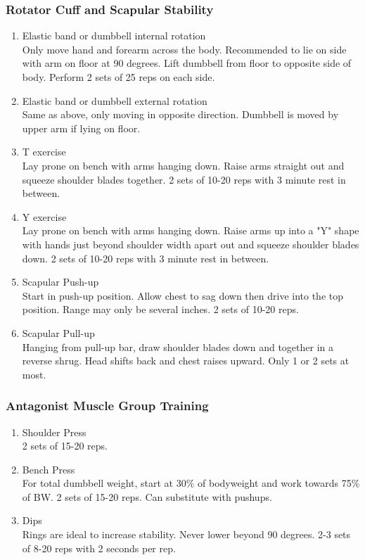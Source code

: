 \documentclass[12pt, letterpaper]{article}
\begin{document}
\subsubsection{Rotator Cuff and Scapular Stability}

\begin{enumerate}
    \item Elastic band or dumbbell internal rotation \\ 
          Only move hand and forearm across the body. Recommended to lie on side with arm on floor 
          at 90 degrees. Lift dumbbell from floor to opposite side of body. 
          Perform 2 sets of 25 reps on each side.
    \item Elastic band or dumbbell external rotation \\ 
          Same as above, only moving in opposite direction. Dumbbell is moved by upper arm if 
          lying on floor.
    \item T exercise \\ 
          Lay prone on bench with arms hanging down. Raise arms straight out and squeeze 
          shoulder blades together. 2 sets of 10-20 reps with 3 minute rest in between.
    \item Y exercise \\ 
          Lay prone on bench with arms hanging down. Raise arms up into a "Y" shape with 
          hands just beyond shoulder width apart out and squeeze shoulder blades down. 
          2 sets of 10-20 reps with 3 minute rest in between.
    \item Scapular Push-up \\ 
          Start in push-up position. Allow chest to sag down then drive into the top position. 
          Range may only be several inches. 2 sets of 10-20 reps.
    \item Scapular Pull-up \\ 
          Hanging from pull-up bar, draw shoulder blades down and together in a reverse shrug. 
          Head shifts back and chest raises upward. Only 1 or 2 sets at most.
\end{enumerate}

\subsubsection{Antagonist Muscle Group Training}

\begin{enumerate}
    \item Shoulder Press \\ 
          2 sets of 15-20 reps.
    \item Bench Press \\ 
          For total dumbbell weight, start at 30\% of bodyweight and work towards 75\% of BW. 2 sets of 15-20 reps. 
          Can substitute with pushups.
    \item Dips \\ 
          Rings are ideal to increase stability. Never lower beyond 90 degrees. 2-3 sets of 8-20 reps with 2 seconds per rep.
\end{enumerate}
\end{document}
